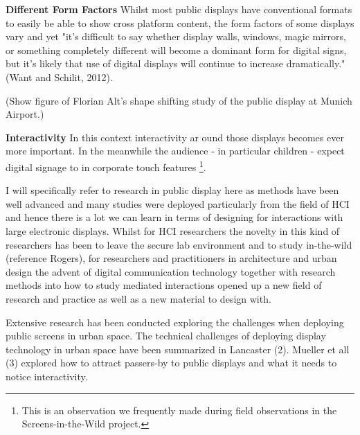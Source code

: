 \textbf{Different Form Factors}
Whilst most public displays have conventional formats to easily be able to show cross platform content, the form factors of some displays vary and yet "it’s difficult to say whether display walls, windows, magic mirrors, or something completely different will become a dominant form for digital signs, but it’s likely that use of digital displays will continue to increase dramatically." (Want and Schilit, 2012). 

(Show figure of Florian Alt's shape shifting study of the public display at Munich Airport.)

\textbf{Interactivity}
In this context interactivity ar  ound those displays becomes ever more important. In the meanwhile the audience - in particular children - expect digital signage to in corporate touch features \footnote{This is an observation we frequently made during field observations in the Screens-in-the-Wild project.}. 



I will specifically refer to research in public display here as methods have been well advanced and many studies were deployed particularly from the field of HCI and hence there is a lot we can learn in terms of designing for interactions with large electronic displays. 
Whilst for HCI researchers the novelty in this kind of researchers has been to leave the secure lab environment and to study in-the-wild (reference Rogers), for researchers and practitioners in architecture and urban design the advent of digital communication technology together with research methods into how to study mediated interactions opened up a new field of research and practice as well as a new material to design with.   

Extensive research has been conducted exploring the challenges when deploying public screens in urban space. 
The technical challenges of deploying display technology in urban space have been summarized in Lancaster (2). 
Mueller et all (3) explored how to attract passers-by to public displays and what it needs to notice interactivity. 

